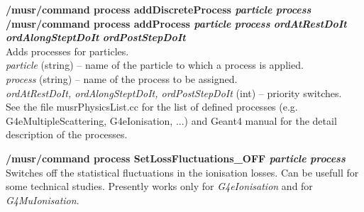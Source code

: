 \documentclass[twoside]{dis04}
\begin{document}
\begin{description}
\item{\bf /musr/command process addDiscreteProcess \emph{particle} \emph{process}}\\
{\bf /musr/command process addProcess \emph{particle} \emph{process} \emph{ordAtRestDoIt} \emph{ordAlongSteptDoIt} \emph{ordPostStepDoIt}}\\
	Adds processes for particles. \\
	\emph{particle} (string) -- name of the particle to which a process is applied.\\
	\emph{process} (string) -- name of the process to be assigned.\\
	\emph{ordAtRestDoIt, ordAlongSteptDoIt, ordPostStepDoIt} (int) -- priority switches.\\
	See the file musrPhysicsList.cc for the list of defined processes (e.g. G4eMultipleScattering,
	G4eIonisation, ...) and Geant4 manual for the detail description of the processes.

\item{\bf /musr/command process SetLossFluctuations\_OFF \emph{particle} \emph{process}}\\
        Switches off the statistical fluctuations in the ionisation losses.  Can be usefull
	for some technical studies.  Presently works only for \emph{G4eIonisation} and
	for \emph{G4MuIonisation}.
\end{description}
\end{document}
